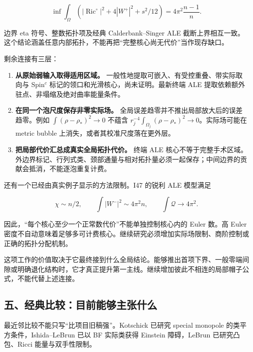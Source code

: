 \documentclass[
  10pt,
]{article}
\providecommand{\tightlist}{%
  \setlength{\itemsep}{0pt}\setlength{\parskip}{0pt}}
\begin{document}
\[
\boxed{
\inf\int_\Omega
\left(|\operatorname{Ric}^{\circ}|^2+4|W^+|^2+s^2/12\right)
=4\pi^2\frac{n-1}{n}.
}
\]

边界 eta 符号、整数拓扑项及经典 Calderbank--Singer ALE
截断上界相互一致。这个结论涵盖任意内部拓扑，不能再把``完整核心尚无代价''当作现存缺口。

剩余连接有三层：

\begin{enumerate}
\def\labelenumi{\arabic{enumi}.}
\tightlist
\item
  \textbf{从原始弱输入取得适用区域。}
  一般性地提取可嵌入、有受控重叠、带实际取向与 Spin\(^c\)
  标记的领口和光滑核心，尚未证明。最新终端 ALE
  提取依赖额外驻点、非塌缩及绝对曲率能量条件。
\item
  \textbf{在同一个泡尺度保存非零实际场。}
  全局误差趋零并不推出局部放大后的误差趋零。例如
  \(\int(\rho-\rho_*)^2\to0\) 不蕴含
  \(r_j^{-4}\int_{\Omega_j}(\rho-\rho_*)^2\to0\)。实际场可能在 metric
  bubble 上消失，或者其校准尺度落在更外层。
\item
  \textbf{把局部代价汇总成真实全局拓扑代价。} 终端 ALE
  核心不等于完整手术区域。外边界标记、行列式类、颈部通量与相对拓扑量必须一起保存；中间边界的贡献会抵消，不能逐泡重复计费。
\end{enumerate}

还有一个已经由真实例子显示的方法限制。I47 的锐利 ALE 模型满足

\[
\chi\sim n/2,\qquad
\int|W^-|^2\sim4\pi^2n,\qquad
\int\mathscr Q\longrightarrow4\pi^2.
\]

因此，``每个核心至少一个正常数代价''不能单独控制核心内的 Euler 数。高
Euler
密度不自动意味着足够多可计费核心。继续研究必须增加实际场限制、商阶控制或正确的拓扑分配机制。

这项工作的价值取决于它最终接到什么全局结论。能够推出首项下界、一般零端间隙或明确退化结构时，它才真正提升第一主线。继续增加彼此不相连的局部帽子公式，不能代替上述连接。

\hypertarget{ux4e94ux7ecfux5178ux6bd4ux8f83ux76eeux524dux80fdux591fux4e3bux5f20ux4ec0ux4e48}{%
\subsection{五、经典比较：目前能够主张什么}\label{ux4e94ux7ecfux5178ux6bd4ux8f83ux76eeux524dux80fdux591fux4e3bux5f20ux4ec0ux4e48}}

最近邻比较不能只写``比项目旧稿强''。Kotschick 已研究 special monopole
的类平方条件，Ishida--LeBrun 已以 BF 实际类获得 Einstein 障碍，LeBrun
已研究凸包、Ricci 能量与双手性限制。
\end{document}
